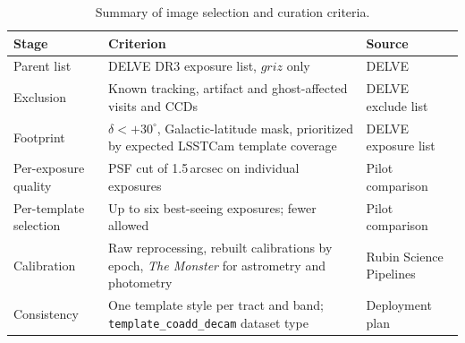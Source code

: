 \begin{table}[t]
\centering
\small
\begin{tabular}{@{}p{}p{}p{}@{}}
\toprule
Stage & Criterion & Source \\  \hline  \hline
\midrule
Parent list & DELVE DR3 exposure list, $griz$ only & DELVE \\ \hline
Exclusion & Known tracking, artifact and ghost-affected visits and CCDs & DELVE exclude list \\ \hline
Footprint & $\delta < +30^\circ$, Galactic-latitude mask, prioritized by expected LSSTCam template coverage & DELVE exposure list \\ \hline
Per-exposure quality & PSF cut of 1.5\,arcsec on individual exposures & Pilot comparison \\ \hline
Per-template selection & Up to six best-seeing exposures; fewer allowed & Pilot comparison \\ \hline
Calibration & Raw reprocessing, rebuilt calibrations by epoch, \textit{The Monster} for astrometry and photometry & Rubin Science Pipelines \\ \hline
Consistency & One template style per tract and band; \texttt{template\_coadd\_decam} dataset type & Deployment plan \\
\bottomrule
\end{tabular}
\caption{Summary of image selection and curation criteria.}
\label{tab:criteria}
\end{table}